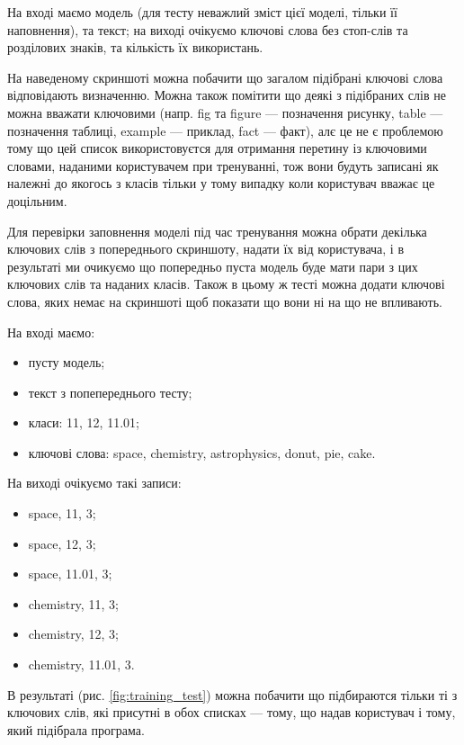 \documentclass[14pt]{extarticle}
\begin{document}
  На вході маємо модель
  (для тесту неважлий зміст цієї моделі, тільки її наповнення),
  та текст; на виході очікуємо ключові слова без стоп-слів та розділових знаків,
  та кількість їх використань.

  На наведеному скриншоті можна побачити
  що загалом підібрані ключові слова відповідають визначенню.
  Можна також помітити що деякі з підібраних слів не можна вважати ключовими
  (напр. fig та figure --- позначення рисунку,
  table --- позначення таблиці, example --- приклад, fact --- факт),
  алє це не є проблемою тому що цей список використовуєтся
  для отримання перетину із ключовими словами,
  наданими користувачем при тренуванні,
  тож вони будуть записані як належні до якогось з класів тільки
  у тому випадку коли користувач вважає це доцільним.

  Для перевірки заповнення моделі під час тренування можна обрати декілька
  ключових слів з попереднього скриншоту, надати їх від користувача,
  і в результаті ми очикуємо що попередньо пуста модель буде мати
  пари з цих ключових слів та наданих класів.
  Також в цьому ж тесті можна додати ключові слова,
  яких немає на скриншоті щоб показати що вони ні на що не впливають.

  На вході маємо:
  \begin{itemize}[labelindent=\dimexpr{}\relax, leftmargin=*]
    \item пусту модель;
    \item текст з попепереднього тесту;
    \item класи: 11, 12, 11.01;
    \item ключові слова: space, chemistry, astrophysics, donut, pie, cake.
  \end{itemize}

  На виході очікуємо такі записи:
  \begin{itemize}[labelindent=\dimexpr{}\relax, leftmargin=*]
    \item space, 11, 3;
    \item space, 12, 3;
    \item space, 11.01, 3;
    \item chemistry, 11, 3;
    \item chemistry, 12, 3;
    \item chemistry, 11.01, 3.
  \end{itemize}

  В результаті (рис. \ref{fig:training_test}) можна побачити що підбираются
  тільки ті з ключових слів, які присутні в обох списках ---
  тому, що надав користувач і тому, який підібрала програма.
\end{document}

